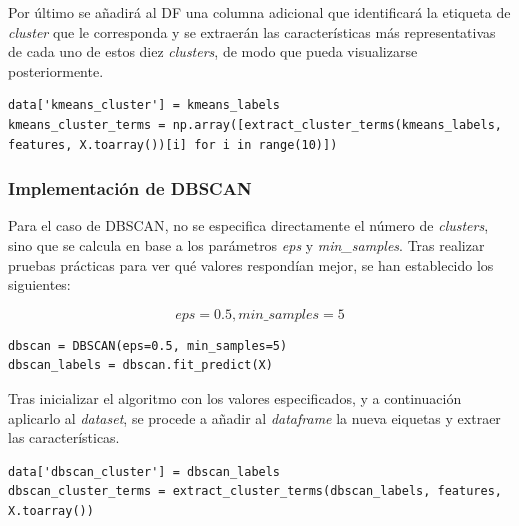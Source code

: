 Por último se añadirá al \gls{DF} una columna adicional que identificará la etiqueta de \textit{cluster} que le corresponda y se extraerán las características más representativas de cada uno de estos diez \textit{clusters}, de modo que pueda visualizarse posteriormente.


\begin{center}
    \begin{mdframed}
    \footnotesize
            \begin{verbatim}
data['kmeans_cluster'] = kmeans_labels
kmeans_cluster_terms = np.array([extract_cluster_terms(kmeans_labels, 
features, X.toarray())[i] for i in range(10)])
            \end{verbatim}
    \end{mdframed}
\end{center}

\subsubsection*{Implementación de \gls{DBSCAN}}

Para el caso de \gls{DBSCAN}, no se especifica directamente el número de \textit{clusters}, sino que se calcula en base a los parámetros \textit{eps} y \textit{min\_samples}. Tras realizar pruebas prácticas para ver qué valores respondían mejor, se han establecido los siguientes:

\[eps = 0.5, min\_samples = 5\]

\begin{center}
    \begin{mdframed}
    \footnotesize
            \begin{verbatim}
dbscan = DBSCAN(eps=0.5, min_samples=5)
dbscan_labels = dbscan.fit_predict(X)
            \end{verbatim}
    \end{mdframed}
\end{center}

Tras inicializar el algoritmo con los valores especificados, y a continuación aplicarlo al \textit{dataset}, se procede a añadir al \textit{dataframe} la nueva eiquetas y extraer las características.

\begin{center}
    \begin{mdframed}
    \footnotesize
            \begin{verbatim}
data['dbscan_cluster'] = dbscan_labels
dbscan_cluster_terms = extract_cluster_terms(dbscan_labels, features, 
X.toarray())
            \end{verbatim}
    \end{mdframed}
\end{center}

